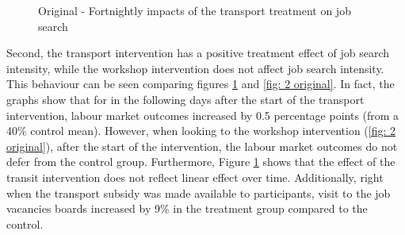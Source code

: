 \documentclass{article}
\begin{document}
\begin{figure}[h!]
\censubtering
\caption{Original - Fortnightly impacts of the transport treatment on job search}
  \qquad
  \label{fig: 1 original}
\end{figure}

\noindent Second, the transport intervention has a positive treatment effect of job search intensity, while the workshop intervention does not affect job search intensity. This behaviour can be seen comparing figures \ref{fig: 1 original} and \ref{fig: 2 original}. In fact, the graphs show that for in the following days after the start of the transport intervention, labour market outcomes increased by 0.5 percentage points (from a 40\% control mean). However, when looking to the workshop intervention (\ref{fig: 2 original}), after the start of the intervention, the labour market outcomes do not defer from the control group. Furthermore, Figure \ref{fig: 1 original} shows that the effect of the transit intervention does not reflect linear effect over time. Additionally, right when the transport subsidy was made available to participants,  visit to the job vacancies boards increased by 9\% in the treatment group compared to the control.
\end{document}
